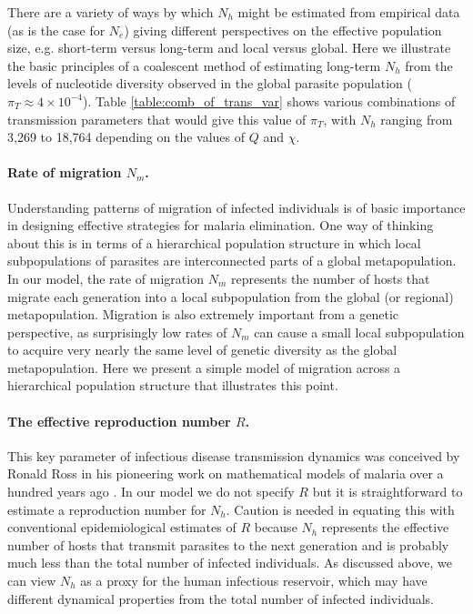 \documentclass[_main.tex]{subfiles}
\begin{document}
There are a variety of ways by which $N_h$ might be estimated from empirical data (as is the case for $N_e$) giving different perspectives on the effective population size, e.g. short-term versus long-term and local versus global.  Here we illustrate the basic principles of a coalescent method of estimating long-term $N_h$ from the levels of nucleotide diversity observed in the global parasite population ($\pi_T \approx 4 \times 10^{-4}$).  Table \ref{table:comb_of_trans_var} shows various combinations of transmission parameters that would give this value of $\pi_T$, with $N_h$ ranging from 3,269 to 18,764 depending on the values of $Q$ and $\chi$.

\paragraph{Rate of migration $N_m$.}  Understanding patterns of migration of infected individuals is of basic importance in designing effective strategies for malaria elimination.  One way of thinking about this is in terms of a hierarchical population structure in which local subpopulations of parasites are interconnected parts of a global metapopulation.  In our model, the rate of migration $N_m$ represents the number of hosts that migrate each generation into a local subpopulation from the global (or regional) metapopulation.  Migration is also extremely important from a genetic perspective, as surprisingly low rates of $N_m$ can cause a small local subpopulation to acquire very nearly the same level of genetic diversity as the global metapopulation.  Here we present a simple model of migration across a hierarchical population structure that illustrates this point.

\paragraph{The effective reproduction number $R$.}  This key parameter of infectious disease transmission dynamics was conceived by Ronald Ross in his pioneering work on mathematical models of malaria over a hundred years ago \cite{Ross1915,Smith2012}.   In our model we do not specify $R$ but it is straightforward to estimate a reproduction number for $N_h$. Caution is needed in equating this with conventional epidemiological estimates of $R$ because $N_h$ represents the effective number of hosts that transmit parasites to the next generation and is probably much less than the total number of infected individuals.  As discussed above, we can view $N_h$ as a proxy for the human infectious reservoir, which may have different dynamical properties from the total number of infected individuals.
\end{document}
